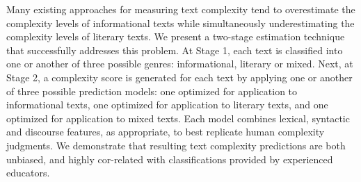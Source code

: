 Many existing approaches for measuring text complexity tend to overestimate the complexity levels of informational texts while simultaneously underestimating
 the complexity levels of literary texts. We present a two-stage estimation
 technique that successfully addresses this problem. At Stage 1, each text is
 classified into one or another of three possible genres: informational,
 literary or mixed. Next, at Stage 2, a complexity score is generated for each
 text by applying one or another of three possible prediction models: one
 optimized for application to informational texts, one optimized for application
 to literary texts, and one optimized for application to mixed texts. Each model
 combines lexical, syntactic and discourse features, as appropriate, to best
 replicate human complexity judgments. We demonstrate that resulting text
 complexity predictions are both unbiased, and highly cor-related with
 classifications provided by experienced educators.


